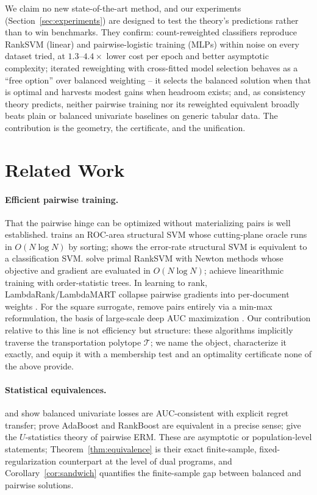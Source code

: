 \documentclass[11pt]{article}
\theoremstyle{remark}
\begin{document}
We claim no new state-of-the-art method, and our experiments
(Section~\ref{sec:experiments}) are designed to test the theory's
predictions rather than to win benchmarks. They confirm: count-reweighted
classifiers reproduce RankSVM (linear) and pairwise-logistic training (MLPs)
within noise on every dataset tried, at $1.3$--$4.4\times$ lower cost per
epoch and better asymptotic complexity; iterated reweighting with
cross-fitted model selection behaves as a ``free option'' over balanced
weighting -- it selects the balanced solution when that is optimal and
harvests modest gains when headroom exists; and, as consistency theory
predicts, neither pairwise training nor its reweighted equivalent broadly
beats plain or balanced univariate baselines on generic tabular data. The
contribution is the geometry, the certificate, and the unification.

\section{Related Work}
\label{sec:related}

\paragraph{Efficient pairwise training.} That the pairwise hinge can be
optimized without materializing pairs is well established.
\citet{joachims2005} trains an ROC-area structural SVM whose cutting-plane
oracle runs in $O(N \log N)$ by sorting; \citet{joachims2006} shows the
error-rate structural SVM is equivalent to a classification SVM.
\citet{chapelle2010} solve primal RankSVM with Newton methods whose
objective and gradient are evaluated in $O(N \log N)$; \citet{airola2011}
achieve linearithmic training with order-statistic trees. In learning to
rank, LambdaRank/LambdaMART collapse pairwise gradients into per-document
weights \citep{burges2010}. For the square surrogate, \citet{ying2016}
remove pairs entirely via a min-max reformulation, the basis of large-scale
deep AUC maximization \citep{yuan2021,yang2022}. Our contribution relative
to this line is not efficiency but structure: these algorithms implicitly
traverse the transportation polytope $\mathcal{T}$; we name the object,
characterize it exactly, and equip it with a membership test and an
optimality certificate none of the above provide.

\paragraph{Statistical equivalences.} \citet{kotlowski2011} and
\citet{agarwal2014} show balanced univariate losses are AUC-consistent with
explicit regret transfer; \citet{ertekin2011} prove AdaBoost and RankBoost
are equivalent in a precise sense; \citet{clemencon2008} give the
$U$-statistics theory of pairwise ERM. These are asymptotic or
population-level statements; Theorem~\ref{thm:equivalence} is their exact
finite-sample, fixed-regularization counterpart at the level of dual
programs, and Corollary~\ref{cor:sandwich} quantifies the finite-sample gap
between balanced and pairwise solutions.
\end{document}
